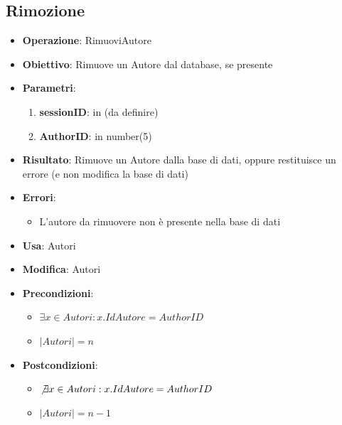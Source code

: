 \documentclass[a4paper,11pt]{article}
\begin{document}
\subsection{Rimozione}
\begin{itemize}
	\item \textbf{Operazione}: RimuoviAutore
	\item \textbf{Obiettivo}: Rimuove un Autore dal database, se presente
	\item \textbf{Parametri}:
	\begin{enumerate}
		\item \textbf{sessionID}: in (da definire)
		\item \textbf{AuthorID}: in number(5)
	\end{enumerate}
	\item \textbf{Risultato}: Rimuove un Autore dalla base di dati, oppure restituisce un errore (e non modifica la base di dati)
	\item \textbf{Errori}: 
	\begin{itemize}
		\item L'autore da rimuovere non è presente nella base di dati
	\end{itemize}
	\item \textbf{Usa}: Autori
	\item \textbf{Modifica}: Autori
	\item \textbf{Precondizioni}:
	\begin{itemize}
		\item $\exists x \in Autori : x.IdAutore = AuthorID$
		\item $|Autori| = n$
	\end{itemize}
	\item \textbf{Postcondizioni}:
	\begin{itemize}
		\item $\not\exists x \in Autori : x.IdAutore = AuthorID$
		\item $|Autori| = n - 1$
	\end{itemize}
\end{itemize}

\end{document}
